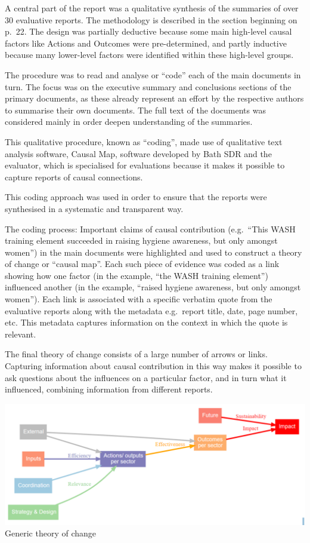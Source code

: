 \documentclass[
]{book}
\begin{document}
A central part of the report was a qualitative synthesis of the summaries of over 30 evaluative reports. The methodology is described in the section beginning on p.~22. The design was partially deductive because some main high-level causal factors like Actions and Outcomes were pre-determined, and partly inductive because many lower-level factors were identified within these high-level groups.

The procedure was to read and analyse or ``code'' each of the main documents in turn.
The focus was on the executive summary and conclusions sections of the primary
documents, as these already represent an effort by the respective authors to summarise
their own documents. The full text of the documents was considered mainly in order
deepen understanding of the summaries.

This qualitative procedure, known as ``coding'', made use of qualitative text analysis
software, Causal Map, software developed by Bath SDR and the evaluator, which is
specialised for evaluations because it makes it possible to capture reports of causal
connections.

This coding approach was used in order to ensure that the reports were
synthesised in a systematic and transparent way.

The coding process: Important claims of causal contribution (e.g.~``This WASH training
element succeeded in raising hygiene awareness, but only amongst women'') in the main
documents were highlighted and used to construct a theory of change or ``causal map''.
Each such piece of evidence was coded as a link showing how one factor (in the example,
``the WASH training element'') influenced another (in the example, ``raised hygiene
awareness, but only amongst women''). Each link is associated with a specific verbatim
quote from the evaluative reports along with the metadata e.g.~report title, date, page
number, etc. This metadata captures information on the context in which the quote is
relevant.

The final theory of change consists of a large number of arrows or links.\\
Capturing information about causal contribution in this way makes it possible to ask
questions about the influences on a particular factor, and in turn what it influenced,
combining information from different reports.

\includegraphics{_assets/ff6196596cc415b9eec16a64ed3d02bb.png}
Generic theory of change
\end{document}
